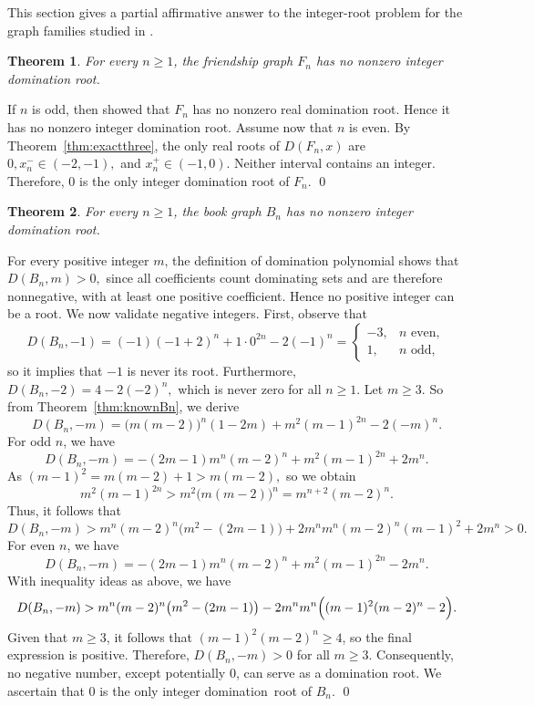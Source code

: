 \documentclass[12pt]{article}
\newtheorem{theorem}{Theorem}[section]
\theoremstyle{definition}
\renewenvironment{proof}{{\noindent\bfseries Proof.}}{\qed}
\begin{document}
	This section gives a partial affirmative answer to the integer-root problem for the graph families studied in \cite{AlikhaniBrownJahari2016}.
	
	\begin{theorem}
		\label{thm:intfriend}
		For every $n\ge 1$, the friendship graph $F_n$ has no nonzero integer domination root.
	\end{theorem}
	
	\begin{proof}
		If $n$ is odd, then \cite{AlikhaniBrownJahari2016} showed that $F_n$ has no nonzero real domination root. Hence it has no nonzero integer domination root. Assume now that $n$ is even. By Theorem~\ref{thm:exactthree}, the only real roots of $D(F_n,x)$ are $0, x_n^- \in (-2,-1),$ and $x_n^+\in(-1,0).$ Neither interval contains an integer. Therefore, $0$ is the only integer domination root of $F_n$.
	\end{proof}
	
	\begin{theorem}
		\label{thm:intbook}
		For every $n\ge 1$, the book graph $B_n$ has no nonzero integer domination root.
	\end{theorem}
	
	\begin{proof}
		For every positive integer $m$, the definition of domination polynomial shows that
		$ D(B_n,m)>0, $ since all coefficients count dominating sets and are therefore nonnegative, with at least one positive coefficient. Hence no positive integer can be a root. We now validate negative integers. First, observe that
		$$
		D(B_n,-1)=(-1)(-1+2)^n+1\cdot 0^{2n}-2(-1)^n=
		\begin{cases}
			-3, & n \text{ even},\\
			1, & n \text{ odd},
		\end{cases}
		$$
		so it implies that $-1$ is never its root. Furthermore, $D(B_n,-2)=4-2(-2)^n,$ which is never zero for all $n\ge 1$.
		 Let $m\ge 3$. So from Theorem~\ref{thm:knownBn}, we derive
		$$
		D(B_n,-m)=\bigl(m(m-2)\bigr)^n(1-2m)+m^2(m-1)^{2n}-2(-m)^n.
		$$
		 For odd $n$, we have
		$$
		D(B_n,-m)=-(2m-1)m^n(m-2)^n+m^2(m-1)^{2n}+2m^n.
		$$
		As $(m-1)^2=m(m-2)+1>m(m-2),$  so we obtain
		$$
		m^2(m-1)^{2n}>m^2\bigl(m(m-2)\bigr)^n=m^{n+2}(m-2)^n.
		$$
		Thus, it follows that
		$$
		D(B_n,-m) >  m^n(m-2)^n\bigl(m^2-(2m-1)\bigr)+2m^n
		 m^n(m-2)^n(m-1)^2+2m^n>0.
		$$
		 For even $n$, we have
		$$
		D(B_n,-m)=-(2m-1)m^n(m-2)^n+m^2(m-1)^{2n}-2m^n.
		$$
		With inequality ideas as above, we have
		$$
		D(B_n,-m)		
		> m^n(m-2)^n\bigl(m^2-(2m-1)\bigr)-2m^n
		 m^n\Bigl((m-1)^2(m-2)^n-2\Bigr).
		$$
		Given that $m \ge 3$, it follows that $(m-1)^2(m-2)^n \ge 4$, so the final expression is positive. Therefore, $D(B_n,-m)>0$ for all $m\ge 3$.
		 Consequently, no negative number, except potentially $0$, can serve as a domination root. We ascertain that $0$ is the only integer domination root of $B_n$.
	\end{proof}
	
\end{document}
